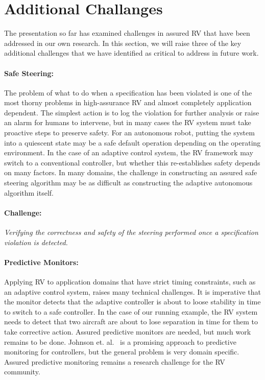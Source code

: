 \section{Additional Challanges }\label{sec:future} 
The presentation so far has examined challenges in assured RV that
have been addressed in our own research. In this section, we will
raise three of the key additional challenges that we have identified
as critical to address in future work.

\paragraph{Safe Steering:} The problem of what to do when a
specification has been violated is one of the most thorny problems in
high-assurance RV and almost completely application dependent. The
simplest action is to log the violation for further analysis or raise
an alarm for humans to intervene, but in many cases the RV system must
take proactive steps to preserve safety. For an autonomous robot,
putting the system into a quiescent state may be a safe default
operation depending on the operating environment.  In the case of an
adaptive control system, the RV framework may switch to a conventional
controller, but whether this re-establishes safety depends on many
factors.  In many domains, the challenge in constructing an assured
safe steering algorithm may be as difficult as constructing the
adaptive autonomous algorithm itself.

\paragraph{Challenge:}  \emph{Verifying the correctness and safety of the
steering performed once a specification violation is detected.}
 

\paragraph{Predictive Monitors:} Applying RV to application domains
that have strict timing constraints, such as an adaptive control
system, raises many technical challenges.  It is imperative that the
monitor detects that the adaptive controller is about to loose
stability in time to switch to a safe controller. In the case of our
running example, the RV system needs to detect that two aircraft are
about to lose separation in time for them to take corrective action.
Assured predictive monitors are needed, but much work remains to be
done.  Johnson et. al.~\cite{johnson2015tecs} is a promising approach
to predictive monitoring for controllers, but the general problem is
very domain specific. Assured predictive monitoring remains a research
challenge for the RV community.

